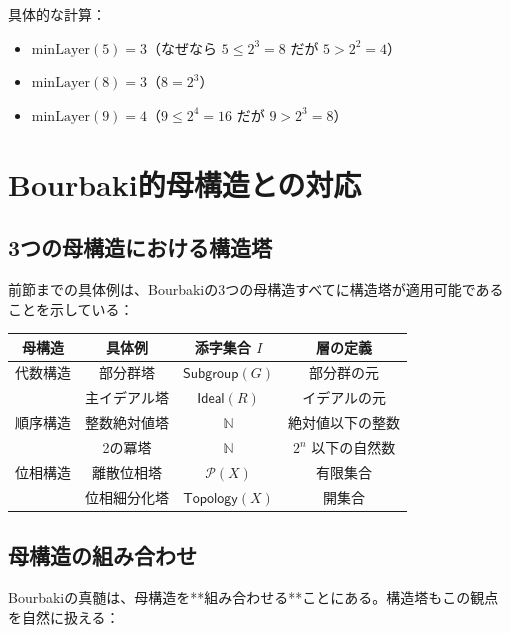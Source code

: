 \documentclass[a4paper,11pt]{ltjsarticle}
\begin{document}
\begin{examplebox}
具体的な計算：
\begin{itemize}
\item $\text{minLayer}(5) = 3$（なぜなら $5 \leq 2^3 = 8$ だが $5 > 2^2 = 4$）
\item $\text{minLayer}(8) = 3$（$8 = 2^3$）
\item $\text{minLayer}(9) = 4$（$9 \leq 2^4 = 16$ だが $9 > 2^3 = 8$）
\end{itemize}
\end{examplebox}

\newpage

\section{Bourbaki的母構造との対応}

\subsection{3つの母構造における構造塔}

前節までの具体例は、Bourbakiの3つの母構造すべてに構造塔が適用可能であることを示している：

\begin{center}
\begin{tabular}{|c|c|c|c|}
\hline
\textbf{母構造} & \textbf{具体例} & \textbf{添字集合 $I$} & \textbf{層の定義} \\
\hline
代数構造 & 部分群塔 & $\mathsf{Subgroup}(G)$ & 部分群の元 \\
& 主イデアル塔 & $\mathsf{Ideal}(R)$ & イデアルの元 \\
\hline
順序構造 & 整数絶対値塔 & $\mathbb{N}$ & 絶対値以下の整数 \\
& 2の冪塔 & $\mathbb{N}$ & $2^n$ 以下の自然数 \\
\hline
位相構造 & 離散位相塔 & $\mathcal{P}(X)$ & 有限集合 \\
& 位相細分化塔 & $\mathsf{Topology}(X)$ & 開集合 \\
\hline
\end{tabular}
\end{center}

\subsection{母構造の組み合わせ}

Bourbakiの真髄は、母構造を**組み合わせる**ことにある。構造塔もこの観点を自然に扱える：
\end{document}
